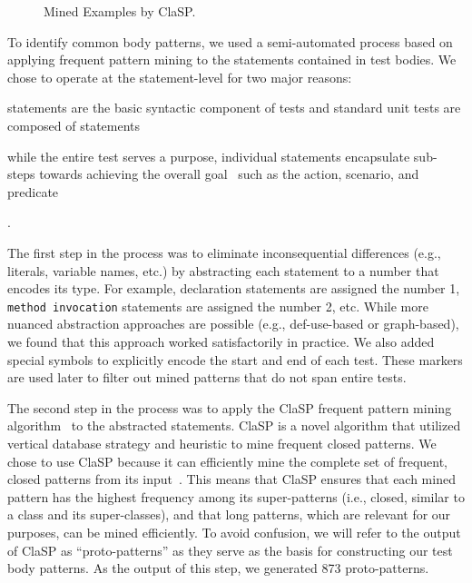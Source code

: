 \documentclass[proposal.tex]{subfiles}
\begin{document}
\begin{figure}[t]
\centering
    \begin{subfigure}{0.9\textwidth}
        \begin{footnotesize}
        
        \end{footnotesize}
    \end{subfigure}
\caption{Mined Examples by ClaSP.}
\label{ClaSP_examples}
\end{figure}


To identify common body patterns, we used a semi-automated process based on applying frequent pattern mining to the statements contained in test bodies.
%
We chose to operate at the statement-level for two major reasons:
\begin{enumerate*}
    \item statements are the basic syntactic component of tests and standard unit tests are composed of statements~\cite{JUnitCook}
    \item while the entire test serves a purpose, individual statements encapsulate sub-steps towards achieving the overall goal~\cite{lakhotia1993understanding} such as the action, scenario, and predicate
\end{enumerate*}.


The first step in the process was to eliminate inconsequential differences (e.g., literals, variable names, etc.) by abstracting each statement to a number that encodes its type.
%
For example, declaration statements are assigned the number \num{1}, \texttt{method invocation} statements are assigned the number \num{2}, etc.
%
While more nuanced abstraction approaches are possible (e.g., def-use-based or graph-based), we found that this approach worked satisfactorily in practice.
%
We also added special symbols to explicitly encode the start and end of each test.
%
These markers are used later to filter out mined patterns that do not span entire tests.


The second step in the process was to apply the ClaSP frequent pattern mining algorithm~\cite{gomariz2013clasp} to the abstracted statements.
ClaSP is a novel algorithm that utilized vertical database strategy and heuristic to mine frequent closed patterns.
%
We chose to use ClaSP because it can efficiently mine the complete set of frequent, closed patterns from its input~\cite{fournier2017survey}.
%
This means that ClaSP ensures that each mined pattern has the highest frequency among its super-patterns (i.e., closed, similar to a class and its super-classes), and that long patterns, which are relevant for our purposes, can be mined efficiently.
%
To avoid confusion, we will refer to the output of ClaSP as \enquote{proto-patterns} as they serve as the basis for constructing our test body patterns.
%
As the output of this step, we generated \num{873} proto-patterns.
\end{document}
